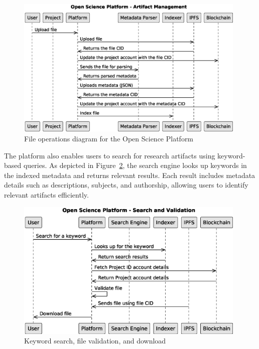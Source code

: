 \documentclass{article}
\begin{document}
\begin{figure}[htbp]
      \centering
      \includegraphics[width=0.98\textwidth, keepaspectratio]{c4_platform_operations_2}
      \caption{File operations diagram for the Open Science Platform}
      \label{fig:c4_file_operations_diagram}
\end{figure}

The platform also enables users to search for research artifacts using keyword-based queries. As depicted in Figure~\ref{fig:c4_keyword_search}, the search engine looks up keywords in the indexed metadata and returns relevant results. Each result includes metadata details such as descriptions, subjects, and authorship, allowing users to identify relevant artifacts efficiently.

\begin{figure}[htbp]
      \centering
      \includegraphics[width=0.98\textwidth, keepaspectratio]{c4_searching_and_validation.eps}
      \caption{Keyword search, file validation, and download}
      \label{fig:c4_keyword_search}
\end{figure}
\end{document}
